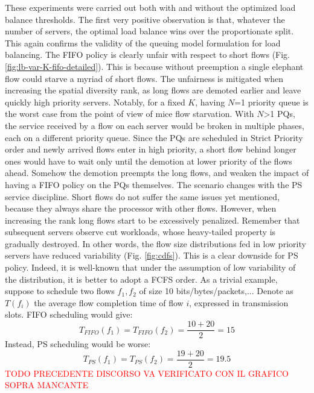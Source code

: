 These experiments were carried out both with and without the optimized load balance thresholds. The first very positive observation is that, whatever the number of servers, the optimal load balance wins over the proportionate split. This again confirms the validity of the queuing model formulation for load balancing. 
The FIFO policy is clearly unfair with respect to short flows (Fig.\ref{fig:lb-var-K-fifo-detailed}). This is because without preemption a single elephant flow could starve a myriad of short flows. The unfairness is mitigated when increasing the spatial diversity rank, as long flows are demoted earlier and leave quickly high priority servers. Notably, for a fixed $K$, having $N$=1 priority queue is the worst case from the point of view of mice flow starvation. With $N$>1 PQs, the service received by a flow on each server would be broken in multiple phases, each on a different priority queue. Since the PQs are scheduled in Strict Priority order and newly arrived flows enter in high priority, a short flow behind longer ones would have to wait only until the demotion at lower priority of the flows ahead. Somehow the demotion preempts the long flows, and weaken the impact of having a FIFO policy on the PQs themselves. The scenario changes with the PS service discipline. Short flows do not suffer the same issues yet mentioned, because they always share the processor with other flows. However, when increasing the rank long flows start to be excessively penalized. Remember that subsequent servers observe cut workloads, whose heavy-tailed property is gradually destroyed. In other words, the flow size distributions fed in low priority servers have reduced variability (Fig. \ref{fig:cdfs}). This is a clear downside for PS policy. Indeed, it is well-known that under the assumption of low variability of the distribution, it is better to adopt a FCFS order. As a trivial example, suppose to schedule two flows $f_1, f_2$ of size 10 bits/bytes/packets,... Denote as $T(f_i)$ the average flow completion time of flow $i$, expressed in transmission slots. FIFO scheduling would give:
\[
	T_{FIFO}(f_1) = T_{FIFO}(f_2) = \dfrac{10+20}{2} = 15
\]
Instead, PS scheduling would be worse:
\[
T_{PS}(f_1) = T_{PS}(f_2) = \dfrac{19+20}{2} = 19.5
\]
\textcolor{red}{TODO PRECEDENTE DISCORSO VA VERIFICATO CON IL GRAFICO SOPRA MANCANTE}\\
